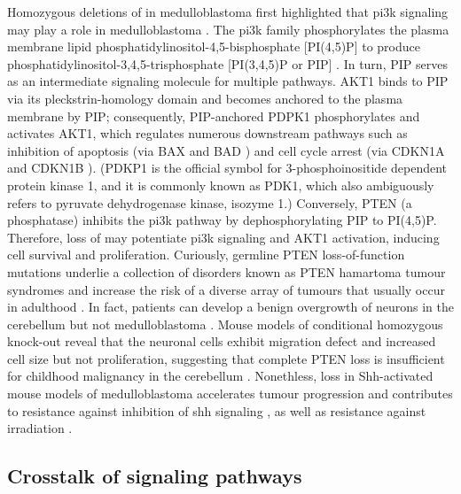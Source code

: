 Homozygous deletions of  in medulloblastoma first highlighted that \gls{pi3k} signaling may play a role in medulloblastoma . The \gls{pi3k} family phosphorylates the plasma membrane lipid phosphatidylinositol-4,5-bisphosphate [PI(4,5)P] to produce phosphatidylinositol-3,4,5-trisphosphate [PI(3,4,5)P or PIP] . In turn, PIP serves as an intermediate signaling molecule for multiple pathways. AKT1 binds to PIP via its pleckstrin-homology domain and becomes anchored to the plasma membrane by PIP; consequently, PIP-anchored PDPK1 phosphorylates and activates AKT1, which regulates numerous downstream pathways such as inhibition of apoptosis (via BAX  and BAD ) and cell cycle arrest (via CDKN1A  and CDKN1B ). (PDKP1 is the official symbol for 3-phosphoinositide dependent protein kinase 1, and it is commonly known as PDK1, which also ambiguously refers to pyruvate dehydrogenase kinase, isozyme 1.) Conversely, PTEN (a phosphatase) inhibits the \gls{pi3k} pathway by dephosphorylating PIP to PI(4,5)P. Therefore, loss of  may potentiate \gls{pi3k} signaling and AKT1 activation, inducing cell survival and proliferation. Curiously, germline PTEN loss-of-function mutations underlie a collection of disorders known as PTEN hamartoma tumour syndromes and increase the risk of a diverse array of tumours that usually occur in adulthood . In fact, patients can develop a benign overgrowth of neurons in the cerebellum but not medulloblastoma . Mouse models of conditional homozygous  knock-out reveal that the neuronal cells exhibit migration defect and increased cell size but not proliferation, suggesting that complete PTEN loss is insufficient for childhood malignancy in the cerebellum . Nonethless,  loss in Shh-activated mouse models of medulloblastoma accelerates tumour progression and contributes to resistance against inhibition of \gls{shh} signaling , as well as resistance against irradiation .


\subsection{Crosstalk of signaling pathways}

